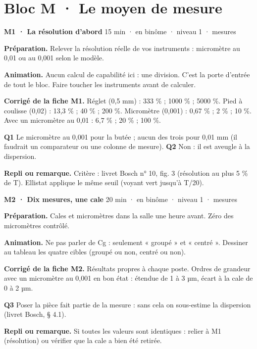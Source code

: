 \section*{Bloc M · Le moyen de mesure}
\begin{tcolorbox}[act]\textbf{M1 · La résolution d'abord} \hfill {\small 15 min · en binôme · niveau 1 · mesures}\end{tcolorbox}
\textbf{Préparation.} Relever la résolution réelle de vos instruments : micromètre au 0,01 ou au 0,001 selon le modèle.\par
\textbf{Animation.} Aucun calcul de capabilité ici : une division. C'est la porte d'entrée de tout le bloc. Faire toucher les instruments avant de calculer.\par
\textbf{\color{ok}Corrigé de la fiche M1.} Réglet (0,5 mm) : 333 \% ; 1000 \% ; 5000 \%. Pied à coulisse (0,02) : 13,3 \% ; 40 \% ; 200 \%. Micromètre (0,001) : 0,67 \% ; 2 \% ; 10 \%. Avec un micromètre au 0,01 : 6,7 \% ; 20 \% ; 100 \%.\par \textbf{Q1} Le micromètre au 0,001 pour la butée ; aucun des trois pour 0,01 mm (il faudrait un comparateur ou une colonne de mesure). \textbf{Q2} Non : il est aveugle à la dispersion.\par
{\small\textbf{Repli ou remarque.} Critère : livret Bosch n° 10, fig. 3 (résolution au plus 5 \% de T). Ellistat applique le même seuil (voyant vert jusqu'à T/20).}\par
\vspace{3pt}
\begin{tcolorbox}[act]\textbf{M2 · Dix mesures, une cale} \hfill {\small 20 min · en binôme · niveau 1 · mesures}\end{tcolorbox}
\textbf{Préparation.} Cales et micromètres dans la salle une heure avant. Zéro des micromètres contrôlé.\par
\textbf{Animation.} Ne pas parler de Cg : seulement « groupé » et « centré ». Dessiner au tableau les quatre cibles (groupé ou non, centré ou non).\par
\textbf{\color{ok}Corrigé de la fiche M2.} Résultats propres à chaque poste. Ordres de grandeur avec un micromètre au 0,001 en bon état : étendue de 1 à 3 µm, écart à la cale de 0 à 2 µm.\par \textbf{Q3} Poser la pièce fait partie de la mesure : sans cela on sous-estime la dispersion (livret Bosch, § 4.1).\par
{\small\textbf{Repli ou remarque.} Si toutes les valeurs sont identiques : relier à M1 (résolution) ou vérifier que la cale a bien été retirée.}\par
